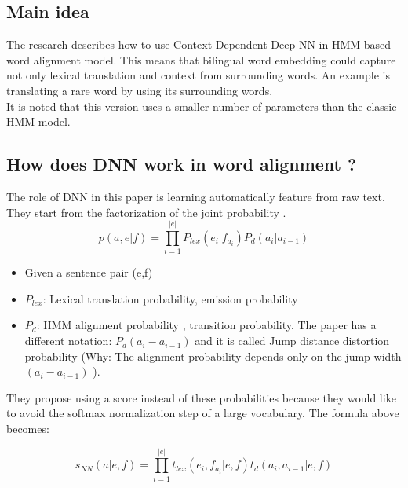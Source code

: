 \documentclass{article}
\begin{document}
\subsection{Main idea}
The research describes how to use Context Dependent Deep NN in HMM-based word alignment model. This means that bilingual word embedding could capture not only lexical translation and context from surrounding words.
An example is translating a rare word by using its surrounding words.\\
It is noted that this version uses a smaller number of parameters than the classic HMM model.

\subsection{How does DNN work in word alignment ?}
The role of DNN in this paper is learning automatically feature from raw text.
They start from the factorization of the joint probability \cite{Vogel1996HMM}.
\begin{equation}
p(a, e| f) = \prod_{i = 1}^{|e|} P_{lex}(e_{i}|f_{a_{i}}) P_{d}(a_{i}|a_{i-1})
\end{equation}
	\begin{itemize}
	\item Given a sentence pair (e,f) 
	\item $P_{lex}$: Lexical translation probability, emission probability
	\item $P_{d}$: HMM alignment probability \cite{Vogel1996HMM}, transition probability. The paper has a different notation: $P_{d}(a_{i} - a_{i-1})$ and it is called Jump distance distortion probability (Why: The alignment probability depends only on the jump width $(a_{i} - a_{i-1})$ \cite{Vogel1996HMM}).
	\end{itemize}

They propose using a score instead of these probabilities because they would like to avoid the softmax normalization step of a large vocabulary. The formula above becomes:

\begin{equation}
s_{NN}(a|e, f) = \prod_{i = 1}^{|e|} t_{lex}(e_{i},f_{a_{i}}|e,f) t_{d}(a_{i},a_{i-1}|e,f)
\label{Yang13wordNNAlignmentScore}
\end{equation}
\end{document}

